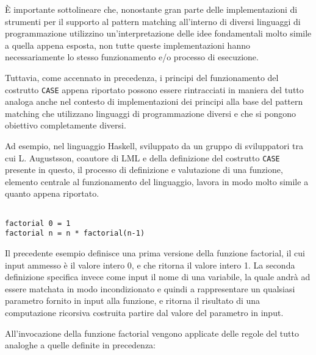 È importante sottolineare che, nonostante gran parte delle implementazioni di
strumenti per il supporto al pattern matching all’interno di diversi linguaggi
di programmazione utilizzino un’interpretazione delle idee fondamentali molto
simile a quella appena esposta, non tutte queste implementazioni hanno
necessariamente lo stesso funzionamento e/o processo di esecuzione.

Tuttavia, come accennato in precedenza, i principi del funzionamento del
costrutto \texttt{CASE} appena riportato possono essere rintracciati in maniera
del tutto analoga anche nel contesto di implementazioni dei principi alla base
del pattern matching che utilizzano linguaggi di programmazione diversi e che si
pongono obiettivo completamente diversi.

Ad esempio, nel linguaggio Haskell, sviluppato da un gruppo di sviluppatori tra
cui L. Augustsson, coautore di LML e della definizione del costrutto
\texttt{CASE} presente in questo, il processo di definizione e valutazione di
una funzione, elemento centrale al funzionamento del linguaggio, lavora in modo
molto simile a quanto appena riportato.

\begin{lstlisting}[caption=Esempio di definizione di una funzione semplificata
per il calcolo del fattoriale utilizzando il linguaggio Haskell.]

factorial 0 = 1
factorial n = n * factorial(n-1)

\end{lstlisting}

Il precedente esempio definisce una prima versione della funzione factorial, il
cui input ammesso è il valore intero 0, e che ritorna il valore intero 1. La
seconda definizione specifica invece come input il nome di una variabile, la
quale andrà ad essere matchata in modo incondizionato e quindi a rappresentare
un qualsiasi parametro fornito in input alla funzione, e ritorna il risultato di
una computazione ricorsiva costruita partire dal valore del parametro in input.

All’invocazione della funzione factorial vengono applicate delle regole del
tutto analoghe a quelle definite in precedenza:

